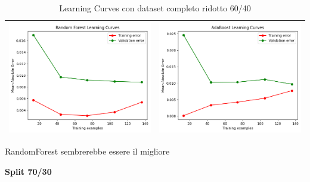 \begin{table}[H]
\begin{tabularx}{\textwidth}{|X|X|}
        \includegraphics[width=\linewidth, trim=0 0 0 0]{images/RandomForest_lc60_ridotto.png} &
        \includegraphics[width=\linewidth, trim=0 0 0 0]{images/AdaBoost_lc60_ridotto.png} \\
        \hline
    \end{tabularx}
    \caption{Learning Curves con dataset completo ridotto 60/40}
    \label{tab:emissions_info}
\end{table}

\noindent RandomForest sembrerebbe essere il migliore

\noindent\textbf{Split 70/30}


